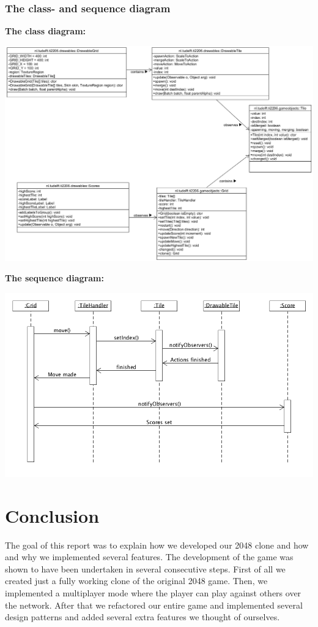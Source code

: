 \documentclass[a4paper,11pt,report]{scrartcl}
\begin{document}
\newpage\subsubsection{The class- and sequence diagram}
\textbf{The class diagram:}\\
\centerline{\includegraphics[scale=0.7]{sources/mvcPattern}}

\newpage\textbf{The sequence diagram:}\\
\centerline{\includegraphics[scale=0.7]{sources/MVCPatternsequence}}

\newpage\section{Conclusion}

The goal of this report was to explain how we developed our 2048 clone and how
and why we implemented several features. 
The development of the game was shown to have been undertaken in several consecutive steps. First of all we created just a fully working clone of the original 2048 game. Then, we implemented a multiplayer mode where the player can play against others over the network. After that we refactored our entire game and implemented several design patterns and added several extra features we thought of ourselves.
\end{document}
